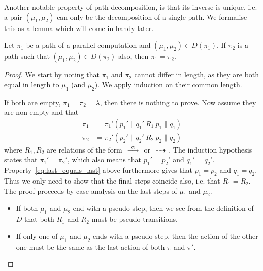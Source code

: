 Another notable property of path decomposition, is that its inverse is unique, i.e.
a pair $(\mu_1,\mu_2)$ can only be the decomposition of a single path. We formalise
this as a lemma which will come in handy later.
\begin{lemma}\label{thm:paths_compose_uniquely}
    Let $\pi_1$ be a path of a parallel computation and $(\mu_1,\mu_2)\in D(\pi_1)$. 
    If $\pi_2$ is a path such
    that $(\mu_1,\mu_2)\in D(\pi_2)$ also, then $\pi_1=\pi_2$.
\end{lemma}
\begin{proof}
    We start by noting that $\pi_1$ and $\pi_2$ cannot differ in length, as they
    are both equal in length to $\mu_1$ (and $\mu_2$). We apply induction on
    their common length.

    If both are empty, $\pi_1=\pi_2=\lambda$, then there is nothing to prove.
    Now assume they are non-empty and that
    \begin{align*}
        \pi_1 &= \pi_1' (p_1' \parallel q_1' \ R_1\  p_1 \parallel q_1) \\
        \pi_2 &= \pi_2' (p_2' \parallel q_2' \ R_2\  p_2 \parallel q_2)
    \end{align*}
    where $R_1,R_2$ are relations of the form $\ {\stackrel{{\alpha}}{\longrightarrow}}\ $ or $\ {\stackrel{_{}}{\dashrightarrow}}\ $.
    The induction hypothesis states that $\pi_1' = \pi_2'$, which also means
    that $p_1'=p_2'$ and $q_1'=q_2'$. Property~\eqref{eq:last_equals_last} above
    furthermore gives that $p_1=p_2$ and $q_1=q_2$.
    Thus we only need to show
    that the final steps coincide also, i.e. that $R_1=R_2$.
    The proof proceeds by case analysis on the last steps of $\mu_1$ and $\mu_2$.    
    \begin{itemize}
        \item If both $\mu_1$ and $\mu_2$ end with a pseudo-step, then we see from the definition
        of $D$ that both $R_1$ and $R_2$ must be pseudo-transitions. 
        
        \item If only one of $\mu_1$ and $\mu_2$ ends with a pseudo-step, then the action
        of the other one must be the same as the last action of both $\pi$ and $\pi'$.
        

\end{itemize}
\end{proof}
